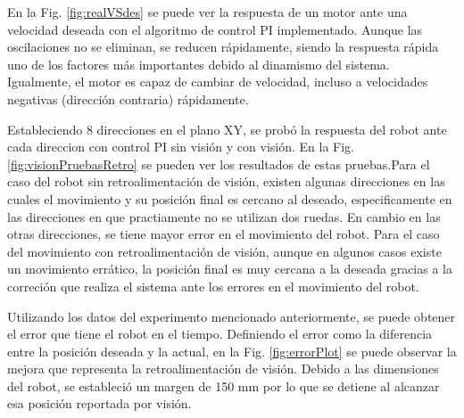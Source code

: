 \documentclass[twocolumn,10pt]{amrob}
\begin{document}
En la Fig. \ref{fig:realVSdes} se puede ver la respuesta de un motor ante una velocidad deseada con el algoritmo de control PI implementado. Aunque las oscilaciones no se eliminan, se reducen rápidamente, siendo la respuesta rápida uno de los factores más importantes debido al dinamismo del sistema. Igualmente, el motor es capaz de cambiar de velocidad, incluso a velocidades negativas (dirección contraria) rápidamente. \par
Estableciendo 8 direcciones en el plano XY, se probó la respuesta del robot ante cada direccion con control PI sin visión y con visión. En la Fig. \ref{fig:visionPruebasRetro} se pueden ver los resultados de estas pruebas.Para el caso del robot sin retroalimentación de visión, existen algunas direcciones en las cuales el movimiento y su posición final es cercano al deseado, especificamente en las direcciones en que practiamente no se utilizan dos ruedas. En cambio en las otras direcciones, se tiene mayor error en el movimiento del robot. Para el caso del movimiento con retroalimentación de visión, aunque en algunos casos existe un movimiento errático, la posición final es muy cercana a la deseada gracias a la correción que realiza el sistema ante los errores en el movimiento del robot. \par
Utilizando los datos del experimento mencionado anteriormente, se puede obtener el error que tiene el robot en el tiempo. Definiendo el error como la diferencia entre la posición deseada y la actual, en la Fig. \ref{fig:errorPlot} se puede observar la mejora que representa la retroalimentación de visión. Debido a las dimensiones del robot, se estableció un margen de 150 mm por lo que se detiene al alcanzar esa posición reportada por visión.
\end{document}
